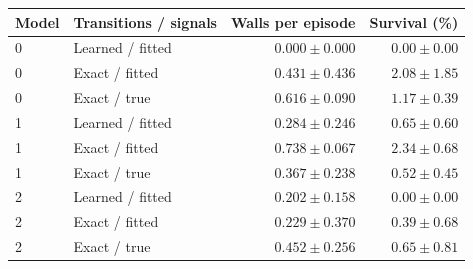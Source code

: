 \begin{tabular}{llrr}
\toprule
\rowcolor{Navy!8}
Model & Transitions / signals & Walls per episode & Survival (\%) \\
\midrule
0 & Learned / fitted & $0.000\pm0.000$ & $0.00\pm0.00$ \\
0 & Exact / fitted & $0.431\pm0.436$ & $2.08\pm1.85$ \\
0 & Exact / true & $0.616\pm0.090$ & $1.17\pm0.39$ \\
\midrule
1 & Learned / fitted & $0.284\pm0.246$ & $0.65\pm0.60$ \\
1 & Exact / fitted & $0.738\pm0.067$ & $2.34\pm0.68$ \\
1 & Exact / true & $0.367\pm0.238$ & $0.52\pm0.45$ \\
\midrule
2 & Learned / fitted & $0.202\pm0.158$ & $0.00\pm0.00$ \\
2 & Exact / fitted & $0.229\pm0.370$ & $0.39\pm0.68$ \\
2 & Exact / true & $0.452\pm0.256$ & $0.65\pm0.81$ \\
\bottomrule
\end{tabular}

